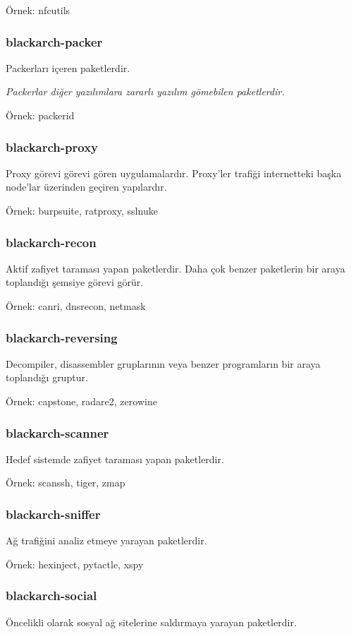 \documentclass[a4paper, oneside, 11pt]{book}
\begin{document}
Örnek: nfcutils

\subsubsection{blackarch-packer}
Packerları içeren paketlerdir.

\textit{Packerlar diğer yazılımlara zararlı yazılım gömebilen paketlerdir.}

Örnek: packerid

\subsubsection{blackarch-proxy}
Proxy görevi görevi gören uygulamalardır. Proxy'ler trafiği internetteki başka node'lar üzerinden geçiren yapılardır.

Örnek: burpsuite, ratproxy, sslnuke

\subsubsection{blackarch-recon}
Aktif zafiyet taraması yapan paketlerdir. Daha çok benzer paketlerin bir araya toplandığı şemsiye görevi görür.

Örnek: canri, dnsrecon, netmask

\subsubsection{blackarch-reversing}
Decompiler, disassembler gruplarının veya benzer programların bir araya toplandığı gruptur.

Örnek: capstone, radare2, zerowine

\subsubsection{blackarch-scanner}
Hedef sistemde zafiyet taraması yapan paketlerdir.

Örnek: scanssh, tiger, zmap

\subsubsection{blackarch-sniffer}
Ağ trafiğini analiz etmeye yarayan paketlerdir.

Örnek: hexinject, pytactle, xspy

\subsubsection{blackarch-social}
Öncelikli olarak sosyal ağ sitelerine saldırmaya yarayan paketlerdir.
\end{document}
